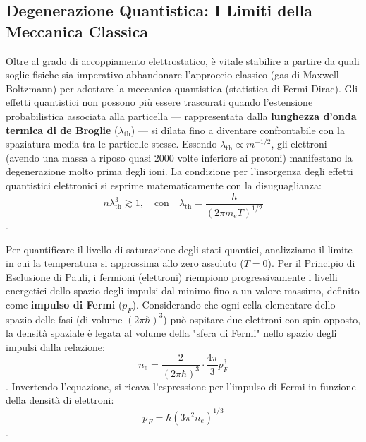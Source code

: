 \subsection{Degenerazione Quantistica: I Limiti della Meccanica Classica}
Oltre al grado di accoppiamento elettrostatico, è vitale stabilire a partire da quali soglie fisiche sia imperativo abbandonare l'approccio classico (gas di Maxwell-Boltzmann) per adottare la meccanica quantistica (statistica di Fermi-Dirac).
Gli effetti quantistici non possono più essere trascurati quando l'estensione probabilistica associata alla particella — rappresentata dalla \textbf{lunghezza d'onda termica di de Broglie} ($\lambda_{\text{th}}$) — si dilata fino a diventare confrontabile con la spaziatura media tra le particelle stesse. Essendo $\lambda_{\text{th}} \propto m^{-1/2}$, gli elettroni (avendo una massa a riposo quasi 2000 volte inferiore ai protoni) manifestano la degenerazione molto prima degli ioni.
La condizione per l'insorgenza degli effetti quantistici elettronici si esprime matematicamente con la disuguaglianza:
\begin{equation}
n \lambda_{\text{th}}^3 \gtrsim 1, \quad \text{con} \quad \lambda_{\text{th}} = \frac{h}{(2\pi m_e T)^{1/2}}
\end{equation}
.

Per quantificare il livello di saturazione degli stati quantici, analizziamo il limite in cui la temperatura si approssima allo zero assoluto ($T=0$). Per il Principio di Esclusione di Pauli, i fermioni (elettroni) riempiono progressivamente i livelli energetici dello spazio degli impulsi dal minimo fino a un valore massimo, definito come \textbf{impulso di Fermi} ($p_F$). Considerando che ogni cella elementare dello spazio delle fasi (di volume $(2\pi\hbar)^3$) può ospitare due elettroni con spin opposto, la densità spaziale è legata al volume della "sfera di Fermi" nello spazio degli impulsi dalla relazione:
\begin{equation}
n_e = \frac{2}{(2\pi\hbar)^3} \cdot \frac{4\pi}{3} p_F^3
\end{equation}
. Invertendo l'equazione, si ricava l'espressione per l'impulso di Fermi in funzione della densità di elettroni:
\begin{equation}
p_F = \hbar(3\pi^2 n_e)^{1/3}
\end{equation}
.

